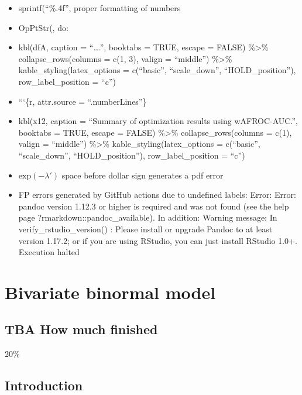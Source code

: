 \documentclass[
]{book}
\providecommand{\tightlist}{%
  \setlength{\itemsep}{0pt}\setlength{\parskip}{0pt}}
\begin{document}
\begin{itemize}
\tightlist
\item
  sprintf(``\%.4f'', proper formatting of numbers
\item
  OpPtStr(, do:
\item
  kbl(dfA, caption = ``\ldots.'', booktabs = TRUE, escape = FALSE) \%\textgreater\% collapse\_rows(columns = c(1, 3), valign = ``middle'') \%\textgreater\% kable\_styling(latex\_options = c(``basic'', ``scale\_down'', ``HOLD\_position''), row\_label\_position = ``c'')
\item
  ```\{r, attr.source = ``.numberLines''\}
\item
  kbl(x12, caption = ``Summary of optimization results using wAFROC-AUC.'', booktabs = TRUE, escape = FALSE) \%\textgreater\% collapse\_rows(columns = c(1), valign = ``middle'') \%\textgreater\% kable\_styling(latex\_options = c(``basic'', ``scale\_down'', ``HOLD\_position''), row\_label\_position = ``c'')
\item
  \(\text{exp} \left ( -\lambda' \right )\) space before dollar sign generates a pdf error
\item
  FP errors generated by GitHub actions due to undefined labels:
  Error: Error: pandoc version 1.12.3 or higher is required and was not found (see the help page ?rmarkdown::pandoc\_available).
  In addition: Warning message:
  In verify\_rstudio\_version() :
  Please install or upgrade Pandoc to at least version 1.17.2; or if you are using RStudio, you can just install RStudio 1.0+.
  Execution halted
\end{itemize}

\hypertarget{bivariate-binormal-model}{%
\chapter{Bivariate binormal model}\label{bivariate-binormal-model}}

\hypertarget{bivariate-binormal-model-how-much-finished}{%
\section{TBA How much finished}\label{bivariate-binormal-model-how-much-finished}}

20\%

\hypertarget{bivariate-binormal-model-introduction}{%
\section{Introduction}\label{bivariate-binormal-model-introduction}}
\end{document}

